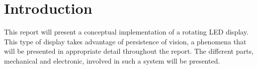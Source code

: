 \section{Introduction}
This report will present a conceptual implementation of a rotating LED display.
This type of display takes advantage of persistence of vision, a phenomena that will be presented in appropriate detail throughout the report.
The different parts, mechanical and electronic, involved in such a system will be presented.